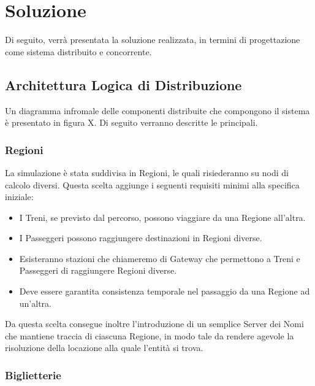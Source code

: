 \chapter{Soluzione}

Di seguito, verrà presentata la soluzione realizzata, in termini di progettazione come sistema distribuito e concorrente.

\section{Architettura Logica di Distribuzione}

Un diagramma infromale delle componenti distribuite che compongono il sistema è presentato in figura X. Di seguito verranno descritte le principali.
	
	\subsection{Regioni}\label{sec:distr_regioni}
	
	La simulazione è stata suddivisa in Regioni, le quali risiederanno su nodi di calcolo diversi. Questa scelta aggiunge i seguenti requisiti minimi alla specifica iniziale:
	\begin{itemize}
		\item I Treni, se previsto dal percorso, possono viaggiare da una Regione all'altra.
		\item I Passeggeri possono raggiungere destinazioni in Regioni diverse.
		\item Esisteranno stazioni che chiameremo di Gateway che permettono a Treni e Passeggeri di raggiungere Regioni diverse. 
		\item Deve essere garantita consistenza temporale nel passaggio da una Regione ad un'altra.
	\end{itemize}
	Da questa scelta consegue inoltre l'introduzione di un semplice Server dei Nomi che mantiene traccia di ciascuna Regione, in modo tale da rendere agevole la risoluzione della locazione alla quale l'entità si trova. 
	
	
	
	\subsection{Biglietterie}
	

